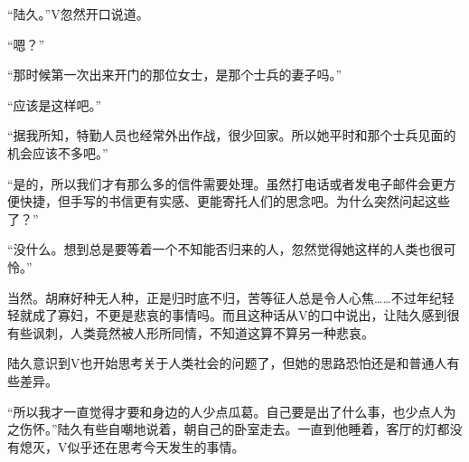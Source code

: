 “陆久。”V忽然开口说道。

“嗯？”

“那时候第一次出来开门的那位女士，是那个士兵的妻子吗。”

“应该是这样吧。”

“据我所知，特勤人员也经常外出作战，很少回家。所以她平时和那个士兵见面的机会应该不多吧。”

“是的，所以我们才有那么多的信件需要处理。虽然打电话或者发电子邮件会更方便快捷，但手写的书信更有实感、更能寄托人们的思念吧。为什么突然问起这些了？”

“没什么。想到总是要等着一个不知能否归来的人，忽然觉得她这样的人类也很可怜。”

当然。胡麻好种无人种，正是归时底不归，苦等征人总是令人心焦……不过年纪轻轻就成了寡妇，不更是悲哀的事情吗。而且这种话从V的口中说出，让陆久感到很有些讽刺，人类竟然被人形所同情，不知道这算不算另一种悲哀。

陆久意识到V也开始思考关于人类社会的问题了，但她的思路恐怕还是和普通人有些差异。

“所以我才一直觉得才要和身边的人少点瓜葛。自己要是出了什么事，也少点人为之伤怀。”陆久有些自嘲地说着，朝自己的卧室走去。一直到他睡着，客厅的灯都没有熄灭，V似乎还在思考今天发生的事情。